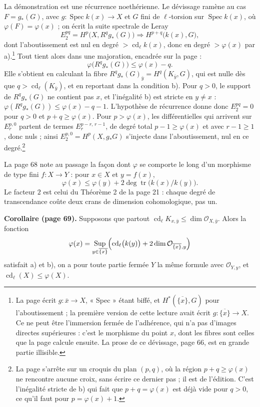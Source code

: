 \documentclass[11pt,a4paper]{article}
\begin{document}
La démonstration est une récurrence noethérienne. Le dévissage ramène au cas
$F = g_{*}(G)$, avec $g : \operatorname{Spec} k(x) \to X$ et $G$ fini de
$\ell$-torsion sur $\operatorname{Spec} k(x)$, où $\varphi(F) = \varphi(x)$ ;
on écrit la suite spectrale de Leray
\[
E_2^{pq} = H^p\bigl(X, R^q g_{*}(G)\bigr) \Longrightarrow
H^{p+q}\bigl(k(x), G\bigr),
\]
dont l'aboutissement est nul en degré $> \operatorname{cd}_{\ell} k(x)$, donc
en degré $> \varphi(x)$ par a).\footnote{La page écrit $g : \bar{x} \to X$,
« Spec » étant biffé, et $H^{*}(\overline{\{x\}}, G)$ pour l'aboutissement ;
la première version de cette lecture avait écrit $g : \overline{\{x\}} \to X$.
Ce ne peut être l'immersion fermée de l'adhérence, qui n'a pas d'images
directes supérieures : c'est le morphisme du point $x$, dont les fibres sont
celles que la page calcule ensuite. La prose de ce dévissage, page 66, est en
grande partie illisible.} Tout tient alors dans une majoration, encadrée sur
la page :
\[
\varphi\bigl(R^q g_{*}(G)\bigr) \leqslant \varphi(x) - q.
\]
Elle s'obtient en calculant la fibre $R^q g_{*}(G)_{\bar{y}} =
H^q(K_{\bar{y}}, G)$, qui est nulle dès que $q > \operatorname{cd}_{\ell}
(K_{\bar{y}})$, et en reportant dans la condition b). Pour $q > 0$, le support
de $R^q g_{*}(G)$ ne contient pas $x$, et l'inégalité b) est stricte en
$y \neq x$ : $\varphi(R^q g_{*}(G)) \leqslant \varphi(x) - q - 1$. L'hypothèse
de récurrence donne donc $E_2^{pq} = 0$ pour $q > 0$ et $p + q \geqslant
\varphi(x)$. Pour $p > \varphi(x)$, les différentielles qui arrivent sur
$E_r^{p,0}$ partent de termes $E_r^{p-r,\,r-1}$, de degré total $p - 1
\geqslant \varphi(x)$ et avec $r - 1 \geqslant 1$, donc nuls ; ainsi $E_2^{p,0} =
H^p(X, g_{*}G)$ s'injecte dans l'aboutissement, nul en ce degré.\footnote{La
page s'arrête sur un croquis du plan $(p, q)$, où la région $p + q \geqslant
\varphi(x)$ ne rencontre aucune croix, sans écrire ce dernier pas ; il est de
l'édition. C'est l'inégalité stricte de b) qui fait que $p + q = \varphi(x)$
est déjà vide pour $q > 0$, ce qu'il faut pour $p = \varphi(x) + 1$.}

La page 68 note au passage la façon dont $\varphi$ se comporte le long d'un
morphisme de type fini $f : X \to Y$ : pour $x \in X$ et $y = f(x)$,
\[
\varphi(x) \leqslant \varphi(y) + 2\deg\operatorname{tr}\bigl(k(x)/k(y)\bigr).
\]
Le facteur $2$ est celui du Théorème 2 de la page 21 : chaque degré de
transcendance coûte deux crans de dimension cohomologique, pas un.

\textbf{Corollaire (page 69).} Supposons que partout
$\operatorname{cd}_{\ell} K_{x,\bar{y}} \leqslant \dim \mathcal{O}_{X,\bar{y}}$.
Alors la fonction
\[
\varphi(x) = \operatorname*{Sup}_{y \in \overline{\{x\}}}
\Bigl(\operatorname{cd}_{\ell}\bigl(k(y)\bigr)
+ 2\dim \mathcal{O}_{\overline{\{x\}},y}\Bigr)
\]
satisfait a) et b), on a pour toute partie fermée $Y$ la même formule avec
$\mathcal{O}_{Y,y}$, et $\operatorname{cd}_{\ell}(X) \leqslant \varphi(X)$.
\end{document}
